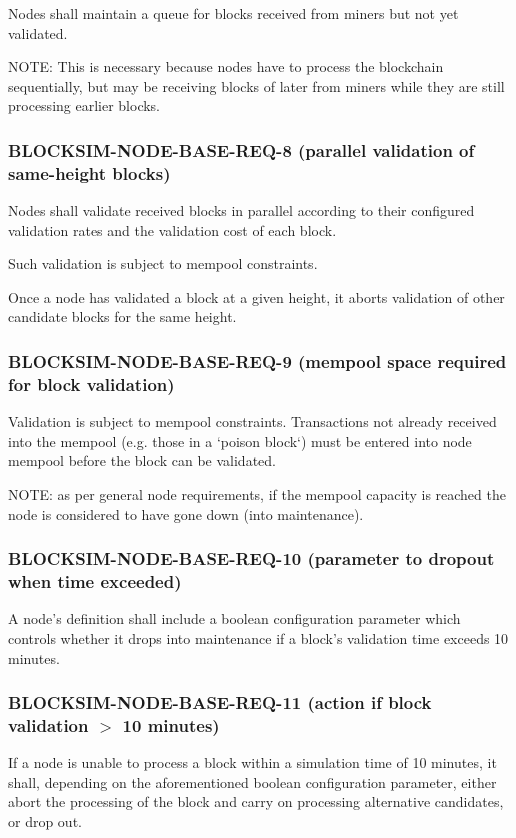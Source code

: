 \documentclass{scrreprt}
\begin{document}
Nodes shall maintain a queue for blocks received from miners but not
yet validated.

NOTE: This is necessary because nodes have to process the blockchain
sequentially, but may be receiving blocks of later from miners while they
are still processing earlier blocks.


\subsubsection{BLOCKSIM-NODE-BASE-REQ-8 (parallel validation of same-height blocks)}

Nodes shall validate received blocks in parallel according to their
configured validation rates and the validation cost of each block.

Such validation is subject to mempool constraints.

Once a node has validated a block at a given height, it aborts validation
of other candidate blocks for the same height.


\subsubsection{BLOCKSIM-NODE-BASE-REQ-9 (mempool space required for block validation)}

Validation is subject to mempool constraints.
Transactions not already received into the mempool (e.g. those in a `poison block`)
must be entered into node mempool before the block can be validated.

NOTE: as per general node requirements, if the mempool capacity is reached
the node is considered to have gone down (into maintenance).


\subsubsection{BLOCKSIM-NODE-BASE-REQ-10 (parameter to dropout when time exceeded)}

A node's definition shall include a boolean configuration parameter which
controls whether it drops into maintenance if a block's validation time exceeds 10 minutes.


\subsubsection{BLOCKSIM-NODE-BASE-REQ-11 (action if block validation $>$ 10 minutes)}

If a node is unable to process a block within a simulation time of 10 minutes,
it shall, depending on the aforementioned  boolean configuration parameter,
either abort the processing of the block and carry on processing alternative
candidates, or drop out.
\end{document}
